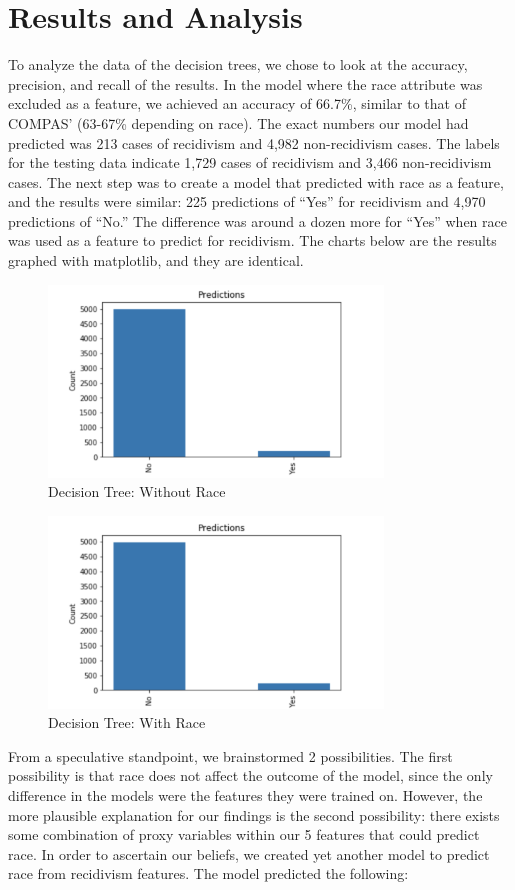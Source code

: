 \documentclass[11pt, sigconf]{acmart}
\begin{document}
\section{Results and Analysis}
To analyze the data of the decision trees, we chose to look at the accuracy, precision, and recall of the results. In the model where the race attribute was excluded as a feature, we achieved an accuracy of 66.7\%, similar to that of COMPAS' (63-67\% depending on race). The exact numbers our model had predicted was 213 cases of recidivism and 4,982 non-recidivism cases. The labels for the testing data indicate 1,729 cases of recidivism and 3,466 non-recidivism cases. The next step was to create a model that predicted with race as a feature, and the results were similar: 225 predictions of ``Yes'' for recidivism and 4,970 predictions of ``No.'' The difference was around a dozen more for ``Yes'' when race was used as a feature to predict for recidivism. The charts below are the results graphed with matplotlib, and they are identical. 


\begin{figure}[h] 	
\centering
\includegraphics[width=3.5in]{2.png}
\caption{Decision Tree: Without Race}
\end{figure}

\begin{figure}[h] 	
\centering
\includegraphics[width=3.5in]{3.png}
\caption{Decision Tree: With Race}
\end{figure}

From a speculative standpoint, we brainstormed 2 possibilities. The first possibility is that race does not affect the outcome of the model, since the only difference in the models were the features they were trained on. However, the more plausible explanation for our findings is the second possibility: there exists some combination of proxy variables within our 5 features that could predict race. In order to ascertain our beliefs, we created yet another model to predict race from recidivism features. The model predicted the following:
\end{document}
